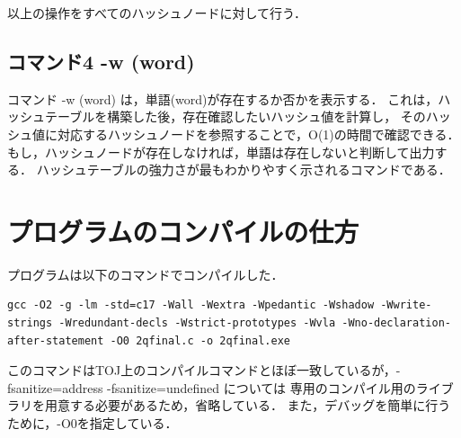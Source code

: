 \documentclass{jsarticle}
\begin{document}
    以上の操作をすべてのハッシュノードに対して行う．

    \subsection{コマンド4 -w (word)}
    コマンド -w (word) は，単語(word)が存在するか否かを表示する．
    これは，ハッシュテーブルを構築した後，存在確認したいハッシュ値を計算し，
    そのハッシュ値に対応するハッシュノードを参照することで，O(1)の時間で確認できる．
    もし，ハッシュノードが存在しなければ，単語は存在しないと判断して出力する．
    ハッシュテーブルの強力さが最もわかりやすく示されるコマンドである．

\section{プログラムのコンパイルの仕方}
プログラムは以下のコマンドでコンパイルした．
\begin{verbatim}
gcc -O2 -g -lm -std=c17 -Wall -Wextra -Wpedantic -Wshadow -Wwrite-strings -Wredundant-decls -Wstrict-prototypes -Wvla -Wno-declaration-after-statement -O0 2qfinal.c -o 2qfinal.exe
\end{verbatim}
このコマンドはTOJ上のコンパイルコマンドとほぼ一致しているが，-fsanitize=address -fsanitize=undefined については
専用のコンパイル用のライブラリを用意する必要があるため，省略している．
また，デバッグを簡単に行うために，-O0を指定している．
\end{document}
